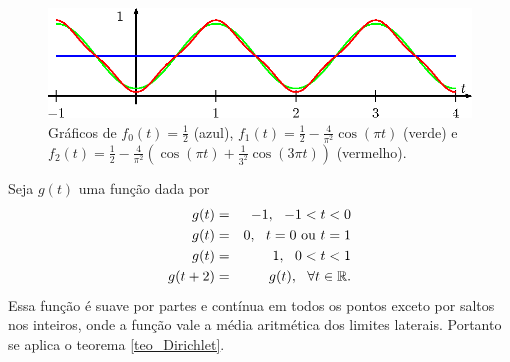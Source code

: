 \begin{ex}
\begin{figure}[!ht]
\begin{center}
\includegraphics{cap_series/pics/figura_2}\end{center}
\caption{\label{fig_conv_triangular}Gráficos de $f_0(t)=\frac{1}{2}$ (azul), $f_1(t)=\frac{1}{2}-\frac{4}{\pi^2}\cos(\pi t)$ (verde) e $f_2(t)=\frac{1}{2}-\frac{4}{\pi^2}\left(\cos(\pi t)+\frac{1}{3^2}\cos(3\pi t)\right)$ (vermelho).}
\end{figure}
\end{ex}
\begin{ex}\label{ex_quadrada} Seja $g(t)$ uma função dada por
\begin{eqnarray*}
g(t)&=&-1, \ \ -1< t<0\\
g(t)&=&0, \ \ t=0\ \hbox{ou}\ t=1\\
g(t)&=&1, \ \ 0< t<1\\
g(t+2)&=&g(t),\ \ \forall t\in\mathbb{R}.
\end{eqnarray*}
Essa função é suave por partes e contínua em todos os pontos exceto por saltos nos inteiros, onde a função vale a média aritmética dos limites laterais. Portanto se aplica o teorema \ref{teo_Dirichlet}.
\begin{figure}[!ht]
\begin{center}


\end{center}
\end{figure}
\end{ex}
